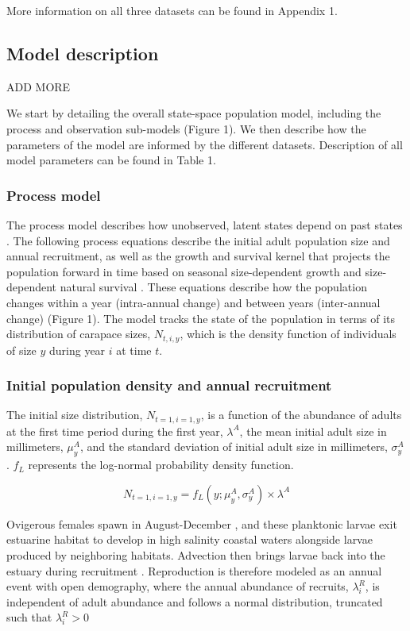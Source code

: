 \documentclass{article}
\begin{document}
More information on all three datasets can be found in Appendix 1. 

\subsection{Model description}

ADD MORE

We start by detailing the overall state-space population model, including the process and observation sub-models (Figure 1). We then describe how the parameters of the model are informed by the different datasets. Description of all model parameters can be found in Table 1.

\subsubsection{Process model}

The process model describes how unobserved, latent states depend on past states \parencite{auger2021guide}. The following process equations describe the initial adult population size and annual recruitment, as well as the growth and survival kernel that projects the population forward in time based on seasonal size-dependent growth and size-dependent natural survival \parencite{rees2014building}. These equations describe how the population changes within a year (intra-annual change) and between years (inter-annual change) (Figure 1). The model tracks the state of the population in terms of its distribution of carapace sizes, $N_{t, i, y}$, which is the density function of individuals of size $y$ during year $i$ at time $t$. 

\subsubsection*{Initial population density and annual recruitment}

The initial size distribution, $N_{t=1, i=1, y}$, is a function of the abundance of adults at the first time period during the first year, $\lambda^{A}$, the mean initial adult size in millimeters, $\mu^A_{y}$, and the standard deviation of initial adult size in millimeters, $\sigma^A_{y}$. $f_L$ represents the log-normal probability density function.

\begin{equation}
N_{t=1, i=1, y} = f_L(y; \mu^A_{y}, \sigma^A_{y}) \times \lambda^A
\end{equation}

Ovigerous females spawn in August-December \parencite{klassen2007biological}, and these planktonic larvae exit estuarine habitat to develop in high salinity coastal waters alongside larvae produced by neighboring habitats. Advection then brings larvae back into the estuary during recruitment \parencite{young2019life}. Reproduction is therefore modeled as an annual event with open demography, where the annual abundance of recruits, $\lambda^R_i$, is independent of adult abundance and follows a normal distribution, truncated such that $\lambda^R_i > 0$  
\end{document}
